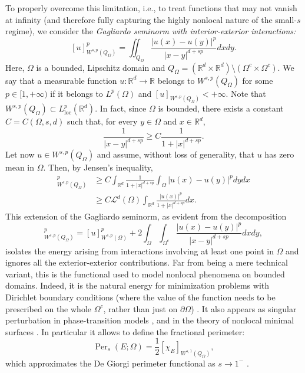 \documentclass[reqno,11pt]{amsart}
\numberwithin{equation}{section}
\theoremstyle{definition} %
\theoremstyle{plain}
\theoremstyle{definition}
\theoremstyle{remark}
\def\elle#1{L^{#1}}
\def\elleom#1{L^{#1}(\Omega)}
\def\Qom{{Q_\Omega}}
\def\O{\Omega}
\def\semin#1#2{ [#1 ]_{#2}}
\def\L{\mathcal{L}}
\def\R{\mathbb{R}}
\def\Rd{\mathbb{R}^d}
\newcommand{\abs}[1]{\left|#1\right|}
\begin{document}
{%

To properly overcome this limitation, i.e., to treat functions that may not vanish at infinity (and therefore fully capturing the highly nonlocal nature of the small-$s$ regime), we consider the \emph{Gagliardo seminorm with interior-exterior interactions:}
\begin{equation}
    \label{def:intro:gagliardoqomega}
    \semin{u}{W^{s,p}(\Qom)}^p=\iint_\Qom\frac{\abs{u(x)-u(y)}^p}{\abs{x-y}^{d+sp}}dxdy.
\end{equation}
Here, $\Omega$ is a bounded, Lipschitz domain and $\Qom=(\Rd\times\Rd)\setminus(\O^c\times\O^c)$. 
We say that a measurable function $u:\Rd\to\R$ belongs to $W^{s,p}(\Qom)$ for some $p\in[1,+\infty)$ if it belongs to $\elleom p$ and $\semin{u}{W^{s,p}(\Qom)}<+\infty$. Note that  $W^{s,p}(\Qom)\subset \elle p_{\text{loc}}(\Rd)$. In fact, since $\O$ is bounded, there exists a constant $C=C(\O,s,d)$ such that, for every $y\in\O$ and $x\in\R^d$,
\begin{equation*}
    \frac{1}{|x-y|^{d+sp}}\geq C\frac{1}{1+|x|^{d+sp}}.
\end{equation*}
Let now $u\in W^{s,p}(Q_\O)$ and assume, without loss of generality, that $u$ has zero mean in $\O$. Then, by Jensen's inequality,
\begin{align*}
    \semin{u}{W^{s,p}(\Qom)}^p&\geq C \int_{\R^d} \frac{1}{1+|x|^{d+sp}}\int_\O|u(x)-u(y)|^p dydx\\
    &\geq C \L^d(\O)\int_{\R^d}\frac{|u(x)|^p}{1+|x|^{d+sp}}dx.
\end{align*}
This extension of the Gagliardo seminorm, as evident from the decomposition
\begin{equation}
    \semin{u}{W^{s,p}(\Qom)}^p=\semin{u}{W^{s,p}(\O)}^p+2\int_\O\int_{\O^c}\frac{\abs{u(x)-u(y)}^p}{\abs{x-y}^{d+sp}}dxdy,
\end{equation}
isolates the energy arising from interactions involving at least one point in $\Omega$ and ignores all the exterior-exterior contributions. Far from being a mere technical variant, this is the functional used to model nonlocal phenomena on bounded domains. Indeed, it is the natural energy for minimization problems with Dirichlet boundary conditions (where the value of the function needs to be prescribed on the whole $\Omega^c$, rather than just on $\partial\Omega$) \cite{DKP_Nonlocal_harnack,Franzina-Palatucci-eigenvalues,Palatucci-sp-Dirichlet}. It also appears as singular perturbation in phase-transition models \cite{SavinValdinoci_gammaconv}, and in the theory of nonlocal minimal surfaces \cite{DSV16,DSV17,DSV20a,DSV20b,DSV26}. In particular %
it allows to define the fractional perimeter:
\[
\operatorname{Per}_s(E;\Omega)=\frac12\semin{\chi_E}{W^{s,1}(\Qom)},
\]
which approximates the De Giorgi perimeter functional as $s\to1^-$ \cite{ADpM-Perimeters,Fanizza-Perimeter}.\\

}
\end{document}
